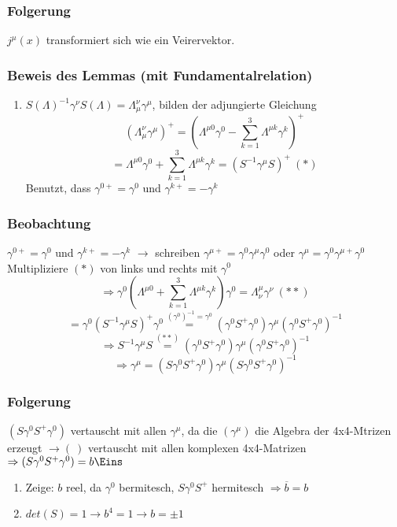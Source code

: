 \documentclass[twoside,a4paper]{scrartcl}
\renewcommand{\1}{\mathds{1}}
\newcommand{\Ra}{\Rightarrow}
\newcommand{\ra}{\rightarrow}
\renewcommand{\L}{\Lambda}
\begin{document}
\subsubsection*{Folgerung}
$j^\mu(x)$ transformiert sich wie ein Veirervektor.
\subsubsection*{Beweis des Lemmas (mit Fundamentalrelation)}
\begin{enumerate}
\item $S(\L)^{-1}\gamma^\nu S(\L)=\L_\mu^\nu\gamma^\mu$, bilden der adjungierte Gleichung
$$(\L_\mu^\nu\gamma^\mu)^+=(\L^{\mu0}\gamma^0-\sum_{k=1}^3 \L^{\mu k}\gamma^k)^+$$
$$=\L^{\mu 0}  \gamma^0+\sum_{k=1}^3 \L^{\mu k} \gamma^k=(S^{-1} \gamma^\mu S)^+ \ (*)$$
Benutzt, dass $\gamma^{0+}=\gamma^0$ und $\gamma^{k+}=-\gamma^k$
\end{enumerate}
\subsubsection*{Beobachtung}
$\gamma^{0+}=\gamma^0$ und $\gamma^{k+}=-\gamma^k$ $\ra$ schreiben $\gamma^{\mu+}=\gamma^0\gamma^\mu\gamma^0$ oder $\gamma^{\mu}=\gamma^0\gamma^{\mu+}\gamma^0$ \\
Multipliziere $(*)$ von links und rechts mit $\gamma^0$\\
$$\Ra \gamma^0(\L^{\mu0}+\sum_{k=1}^3 \L^{\mu k} \gamma^k)\gamma^0=\L_\nu^\mu \gamma^\nu \ (**)$$
$$=\gamma^0(S^{-1} \gamma^\mu S)^+\gamma^0\stackrel{(\gamma^0)^{-1}=\gamma^0}{=} (\gamma^0 S^+\gamma^0)\gamma^\mu(\gamma^0 S^+ \gamma^0)^{-1}$$
$$\Ra S^{-1}\gamma^{\mu} S \stackrel{(**)}{=} (\gamma^0S^+\gamma^0)\gamma^\mu(\gamma^0 S^+ \gamma^0)^{-1}$$
$$\Ra \gamma^\mu=(S\gamma^0S^+\gamma^0) \gamma^\mu (S \gamma^0 S^+ \gamma^0)^{-1}$$ 
\subsubsection*{Folgerung}
$(S\gamma^0 S^+ \gamma^0)$ vertauscht mit allen $\gamma^\mu$, da die $(\gamma^\mu)$ die Algebra der 4x4-Mtrizen erzeugt $\ra (\ )$ vertauscht mit allen komplexen 4x4-Matrizen $\Ra (S \gamma^0 S^+ \gamma^0)=b \Eins$
\begin{enumerate}
\item Zeige: $b$ reel, da $\gamma^0$ bermitesch, $S\gamma^0 S^{+}$ hermitesch $\Ra \overline{b}=b$
\item $det(S)=1 \ra b^4=1 \ra b=\pm 1$
\end{enumerate}
\end{document}
